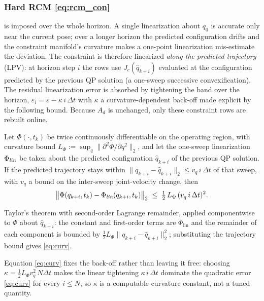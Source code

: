 \subsubsection{Hard RCM \eqref{eq:rcm_con}} is imposed over the whole horizon. A single linearization about $q_0$ is accurate only near the current pose; over a longer horizon the predicted configuration drifts and the constraint manifold's curvature makes a one-point linearization mis-estimate the deviation. The constraint is therefore linearized \emph{along the predicted trajectory} (LPV): at horizon step $i$ the rows use $J_c(\hat{q}_{k+i})$ evaluated at the configuration predicted by the previous QP solution (a one-sweep successive convexification). The residual linearization error is absorbed by tightening the band over the horizon, $\varepsilon_i = \varepsilon - \kappa\, i\,\Delta t$ with $\kappa$ a curvature-dependent back-off made explicit by the following bound. Because $A_d$ is unchanged, only these constraint rows are rebuilt online.

\begin{lemma}\label{lem:curv}
Let $\Phi(\cdot,t_k)$ be twice continuously differentiable on the operating region, with curvature bound $L_\Phi := \sup_q \|\partial^2\Phi/\partial q^2\|_2$, and let the one-sweep linearization $\Phi_{\emph{lin}}$ be taken about the predicted configuration $\hat q_{k+i}$ of the previous QP solution. If the predicted trajectory stays within $\|q_{k+i}-\hat q_{k+i}\|_2 \le v_q\, i\,\Delta t$ of that sweep, with $v_q$ a bound on the inter-sweep joint-velocity change, then
\begin{equation}
\big\|\Phi(q_{k+i},t_k)-\Phi_{\emph{lin}}(q_{k+i},t_k)\big\|_2 \;\le\; \tfrac12\, L_\Phi\,(v_q\, i\,\Delta t)^2 .
\label{eq:curv}
\end{equation}
\end{lemma}

\begin{IEEEproof}
Taylor's theorem with second-order Lagrange remainder, applied componentwise to $\Phi$ about $\hat q_{k+i}$: the constant and first-order terms are $\Phi_{\text{lin}}$ and the remainder of each component is bounded by $\tfrac12 L_\Phi\|q_{k+i}-\hat q_{k+i}\|_2^2$; substituting the trajectory bound gives \eqref{eq:curv}.
\end{IEEEproof}

Equation \eqref{eq:curv} fixes the back-off rather than leaving it free: choosing $\kappa = \tfrac12 L_\Phi v_q^2\, N\Delta t$ makes the linear tightening $\kappa\, i\,\Delta t$ dominate the quadratic error \eqref{eq:curv} for every $i\le N$, so $\kappa$ is a computable curvature constant, not a tuned quantity.

